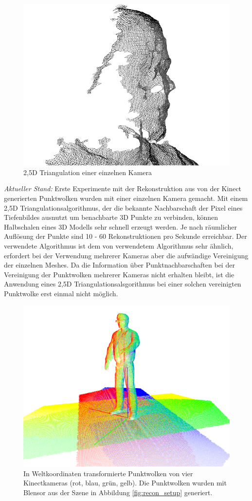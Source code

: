 \begin{figure}[H]
	\centering
	\includegraphics[width=.5\textwidth]{figs/recon_wireframe}
	\caption{2,5D Triangulation einer einzelnen Kamera}
	\label{fig:2dmeshed}
\end{figure}

{\em Aktueller Stand: } Erste Experimente mit der Rekonstruktion aus von der 
Kinect generierten Punktwolken wurden mit einer einzelnen Kamera gemacht. Mit 
einem 2,5D Triangulationsalgorithmus, der die bekannte Nachbarschaft der Pixel 
eines Tiefenbildes ausnutzt um benachbarte 3D Punkte zu verbinden, können Halbschalen 
eines 3D Modells sehr schnell erzeugt werden. Je nach räumlicher Auflösung der 
Punkte sind 10 - 60 Rekonstruktionen pro Sekunde erreichbar. Der verwendete 
Algorithmus ist dem von \cite{alexiadis2013real} verwendetem Algorithmus sehr 
ähnlich, erfordert bei der Verwendung mehrerer Kameras aber die aufwändige 
Vereinigung der einzelnen Meshes. Da die Information über Punktnachbarschaften 
bei der Vereinigung der Punktwolken mehrerer Kameras nicht erhalten bleibt, ist 
die Anwendung eines 2,5D Triangulationsalsgorithmus bei einer solchen vereinigten 
Punktwolke erst einmal nicht möglich.

\begin{figure}[H]
	\centering
	\includegraphics[width=.5\textwidth]{figs/registered_pointclouds}
	\caption{In Weltkoordinaten transformierte Punktwolken von vier 
		Kinectkameras (rot, blau, grün, gelb). Die Punktwolken wurden mit 
		Blensor \cite{Gschwandtner11b} aus der Szene in Abbildung 
		\ref{fig:recon_setup} generiert.}
	\label{fig:cloud_sources}
\end{figure}

